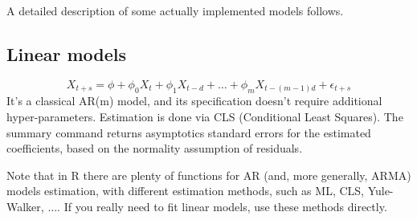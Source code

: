 \documentclass[a4paper]{article}
\begin{document}
A detailed description of some actually implemented models follows.

\subsection{Linear models}
\begin{equation}\label{eq:linear}
X_{t+s} = \phi + \phi_0 X_t + \phi_1 X_{t-d} + \ldots + \phi_m X_{t-(m-1)d} + \epsilon_{t+s}
\end{equation}
It's a classical AR(m) model, and its specification doesn't require additional hyper-parameters. 
Estimation is done via CLS (Conditional Least Squares). 
The summary command returns asymptotics standard errors for the estimated coefficients, based on the normality assumption of residuals.

Note that in R there are plenty of functions for AR (and, more generally, ARMA) models estimation, with different estimation methods, such as ML, CLS, Yule-Walker, $\ldots$. If you really need to fit linear models, use these methods directly.
\end{document}
